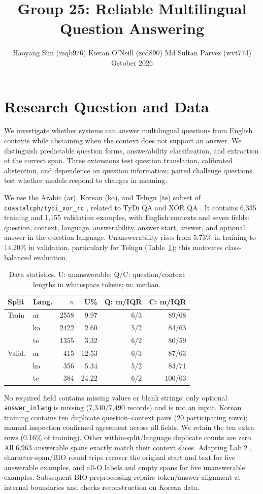 \documentclass[11pt]{article}
\title{Group 25: Reliable Multilingual Question Answering}
\author{\small Haoyang Sun (mqb976) \quad Kieran O'Neill (zcd890) \quad Md Sultan Parvez (wvt774) \\[3pt]
\normalsize\normalfont 30 October 2026}
\begin{document}
\maketitle
\raggedbottom
\section{Research Question and Data}
We investigate whether systems can answer multilingual questions from English contexts while abstaining when the context does not support an answer. We distinguish predictable question forms, answerability classification, and extraction of the correct span. Three extensions test question translation, calibrated abstention, and dependence on question information; paired challenge questions test whether models respond to changes in meaning.

We use the Arabic (ar), Korean (ko), and Telugu (te) subset of \texttt{coastalcph/tydi\_xor\_rc} \citep{dataset}, related to TyDi QA and XOR QA \citep{tydi,xor}. It contains 6,335 training and 1,155 validation examples, with English contexts and seven fields: question, context, language, answerability, answer start, answer, and optional answer in the question language. Unanswerability rises from 5.73\% in training to 14.20\% in validation, particularly for Telugu (Table~\ref{tab:data}); this motivates class-balanced evaluation.

\begin{table}[!ht]
\centering\small\setlength{\tabcolsep}{4pt}
\begin{tabular}{llrrrr}
\toprule
Split & Lang. & $n$ & U\% & Q: m/IQR & C: m/IQR\\
\midrule
Train & ar & 2558 & 9.97 & 6/3 & 89/68\\
 & ko & 2422 & 2.60 & 5/2 & 84/63\\
 & te & 1355 & 3.32 & 6/2 & 80/59\\
Valid. & ar & 415 & 12.53 & 6/3 & 87/63\\
 & ko & 356 & 5.34 & 5/2 & 84/71\\
 & te & 384 & 24.22 & 6/2 & 100/63\\
\bottomrule
\end{tabular}
\caption{Data statistics. U: unanswerable; Q/C: question/context lengths in whitespace tokens; m: median.}
\label{tab:data}
\end{table}

No required field contains missing values or blank strings; only optional \texttt{answer\_inlang} is missing (7,340/7,490 records) and is not an input. Korean training contains ten duplicate question--context pairs (20 participating rows); manual inspection confirmed agreement across all fields. We retain the ten extra rows (0.16\% of training). Other within-split/language duplicate counts are zero. All 6,963 answerable spans exactly match their context slices. Adapting Lab 2 \citep{lab2}, character-span/BIO round trips recover the original start and text for five answerable examples, and all-O labels and empty spans for five unanswerable examples. Subsequent BIO preprocessing repairs token/answer alignment at internal boundaries and checks reconstruction on Korean data.
\end{document}
